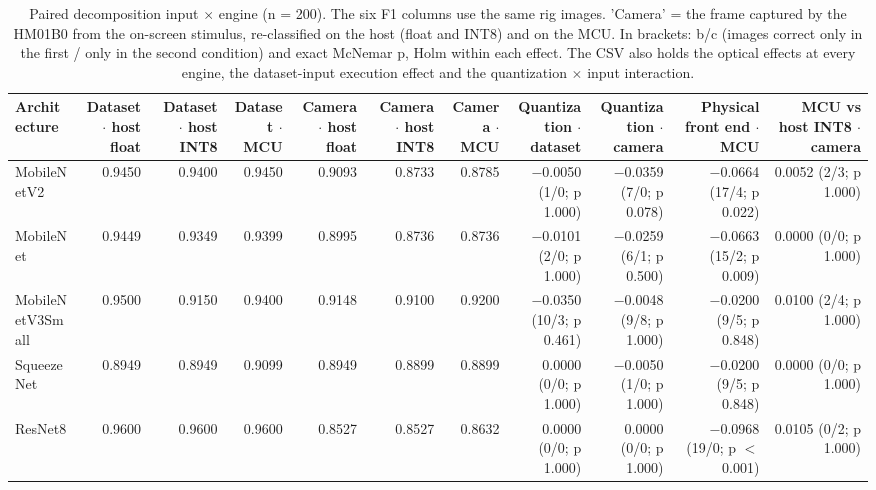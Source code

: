 \begin{table}[htbp]
\centering
\scriptsize
\caption{Paired decomposition input $\times$ engine (n = 200). The six F1 columns use the same rig images. 'Camera' = the frame captured by the HM01B0 from the on-screen stimulus, re-classified on the host (float and INT8) and on the MCU. In brackets: b/c (images correct only in the first / only in the second condition) and exact McNemar p, Holm within each effect. The CSV also holds the optical effects at every engine, the dataset-input execution effect and the quantization $\times$ input interaction.}
\label{tab:ladder2}
\begin{tabular}{lrrrrrrrrrr}
\toprule
Architecture & Dataset $\cdot$ host float & Dataset $\cdot$ host INT8 & Dataset $\cdot$ MCU & Camera $\cdot$ host float & Camera $\cdot$ host INT8 & Camera $\cdot$ MCU & Quantization $\cdot$ dataset & Quantization $\cdot$ camera & Physical front end $\cdot$ MCU & MCU vs host INT8 $\cdot$ camera \\
\midrule
MobileNetV2 & 0.9450 & 0.9400 & 0.9450 & 0.9093 & 0.8733 & 0.8785 & $-$0.0050 (1/0; p 1.000) & $-$0.0359 (7/0; p 0.078) & $-$0.0664 (17/4; p 0.022) & 0.0052 (2/3; p 1.000) \\
MobileNet & 0.9449 & 0.9349 & 0.9399 & 0.8995 & 0.8736 & 0.8736 & $-$0.0101 (2/0; p 1.000) & $-$0.0259 (6/1; p 0.500) & $-$0.0663 (15/2; p 0.009) & 0.0000 (0/0; p 1.000) \\
MobileNetV3Small & 0.9500 & 0.9150 & 0.9400 & 0.9148 & 0.9100 & 0.9200 & $-$0.0350 (10/3; p 0.461) & $-$0.0048 (9/8; p 1.000) & $-$0.0200 (9/5; p 0.848) & 0.0100 (2/4; p 1.000) \\
SqueezeNet & 0.8949 & 0.8949 & 0.9099 & 0.8949 & 0.8899 & 0.8899 & 0.0000 (0/0; p 1.000) & $-$0.0050 (1/0; p 1.000) & $-$0.0200 (9/5; p 0.848) & 0.0000 (0/0; p 1.000) \\
ResNet8 & 0.9600 & 0.9600 & 0.9600 & 0.8527 & 0.8527 & 0.8632 & 0.0000 (0/0; p 1.000) & 0.0000 (0/0; p 1.000) & $-$0.0968 (19/0; p $<$0.001) & 0.0105 (0/2; p 1.000) \\
\bottomrule
\end{tabular}
\end{table}

